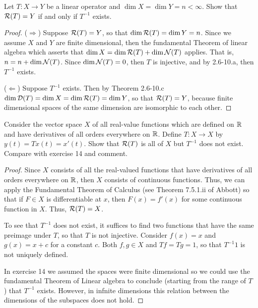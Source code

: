 \begin{exercise}{14}
Let $T:X\to Y$ be a linear operator and $\dim X =\dim Y =n <\infty$. Show that $\mathcal{R}(T)=Y$ if and only if $T^{-1}$ exists.
\end{exercise}
\begin{proof}
($\Rightarrow$) Suppose $\mathcal{R}(T)=Y$, so that $\dim\mathcal{R}(T)=\dim Y=n$. Since we assume $X$ and $Y$ are finite dimensional, then the fundamental Theorem of linear algebra which asserts that $\dim X=\dim\mathcal{R}(T)+\dim\mathcal{N}(T)$ applies. That is, $n=n+\dim\mathcal{N}(T)$. Since $\dim\mathcal{N}(T)=0$, then $T$ is injective, and by 2.6-10.a, then $T^{-1}$ exists.

($\Leftarrow$) Suppose $T^{-1}$ exists. Then by Theorem 2.6-10.c $\dim\mathcal{D}(T)=\dim X=\dim\mathcal{R}(T)=\dim Y$, so that $\mathcal{R}(T)=Y$, because finite dimensional spaces of the same dimension are isomorphic to each other.
\end{proof}

\begin{exercise}{15}
Consider the vector space $X$ of all real-value functions which are defined on $\mathbb{R}$ and have derivatives of all orders everywhere on $\mathbb{R}$. Define $T:X\to X$ by $y(t)=Tx(t)=x'(t)$. Show that $\mathcal{R}(T)$ is all of $X$ but $T^{-1}$ does not exist. Compare with exercise 14 and comment.
\end{exercise}
\begin{proof}
Since $X$ consists of all the real-valued functions that have derivatives of all orders everywhere on $\mathbb{R}$, then $X$ consists of continuous functions. Thus, we can apply the Fundamental Theorem of Calculus (see Theorem 7.5.1.ii of Abbott) so that if $F\in X$ is differentiable at $x$, then $F(x)=f'(x)$ for some continuous function in $X$. Thus, $\mathcal{R}(T)=X$. 

To see that $T^{-1}$ does not exist, it suffices to find two functions that have the same preimage under $T$, so that $T$ is not injective. Consider $f(x)=x$ and $g(x)=x+c$ for a constant $c$. Both $f,g\in X$ and $Tf=Tg=1$, so that $T^{-1}1$ is not uniquely defined.

In exercise 14 we assumed the spaces were finite dimensional so we could use the fundamental Theorem of Linear algebra to conclude (starting from the range of $T$) that $T^{-1}$ exists. However, in infnite dimensions this relation between the dimensions of the subspaces does not hold.
\end{proof}